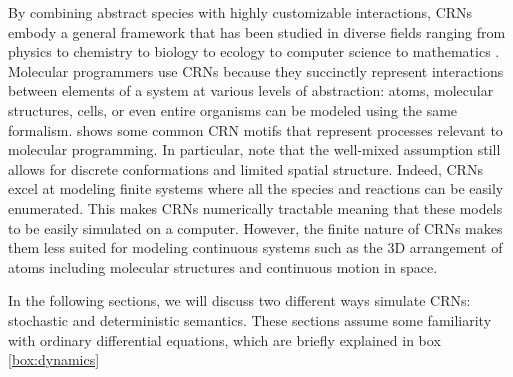By combining abstract species with highly customizable interactions, CRNs embody a general framework that has been studied in diverse fields ranging from physics \cite{} to chemistry \cite{} to biology \cite{} to ecology \cite{} to computer science \cite{} to mathematics \cite{}. Molecular programmers use CRNs because they succinctly represent interactions between elements of a system at various levels of abstraction: atoms, molecular structures, cells, or even entire organisms can be modeled using the same formalism.  shows some common CRN motifs that represent processes relevant to molecular programming. In particular, note that the well-mixed assumption still allows for discrete conformations and limited spatial structure. Indeed, CRNs excel at modeling finite systems where all the species and reactions can be easily enumerated. This makes CRNs numerically tractable meaning that these models to be easily simulated on a computer. However, the finite nature of CRNs makes them less suited for modeling continuous systems such as the 3D arrangement of atoms including molecular structures and continuous motion in space.



In the following sections, we will discuss two different ways simulate CRNs: stochastic and deterministic semantics. These sections assume some familiarity with ordinary differential equations, which are briefly explained in box \ref{box:dynamics}


